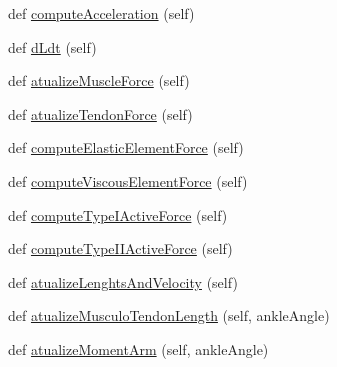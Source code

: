 \begin{DoxyCompactItemize}
\item 
def \hyperlink{class_muscle_hill_1_1_muscle_hill_aa29337f26cdc1d67d65658fab8e0cc41}{compute\+Acceleration} (self)
\item 
def \hyperlink{class_muscle_hill_1_1_muscle_hill_afbcb208bf18110d5fe1d498db8b6f95c}{d\+Ldt} (self)
\item 
def \hyperlink{class_muscle_hill_1_1_muscle_hill_ab39eb3b82b6299bbfbccb6d50f1da8b5}{atualize\+Muscle\+Force} (self)
\item 
def \hyperlink{class_muscle_hill_1_1_muscle_hill_ac40dbbdc08aa96669fe09f03bdffb2f2}{atualize\+Tendon\+Force} (self)
\item 
def \hyperlink{class_muscle_hill_1_1_muscle_hill_adf383b3c1665a6be27791644d67e3c44}{compute\+Elastic\+Element\+Force} (self)
\item 
def \hyperlink{class_muscle_hill_1_1_muscle_hill_ab4181e0db8cb650fd5b448fe58eefd33}{compute\+Viscous\+Element\+Force} (self)
\item 
def \hyperlink{class_muscle_hill_1_1_muscle_hill_a0af765b39293ebf39e992cefa2491141}{compute\+Type\+I\+Active\+Force} (self)
\item 
def \hyperlink{class_muscle_hill_1_1_muscle_hill_a3111f5bea9b94e9bc602a48efe95b146}{compute\+Type\+I\+I\+Active\+Force} (self)
\item 
def \hyperlink{class_muscle_hill_1_1_muscle_hill_a71ea33f1c30bdbe7cd795426bf097e78}{atualize\+Lenghts\+And\+Velocity} (self)
\item 
def \hyperlink{class_muscle_hill_1_1_muscle_hill_aef0260788a88702d48827323e04aa2a7}{atualize\+Musculo\+Tendon\+Length} (self, ankle\+Angle)
\item 
def \hyperlink{class_muscle_hill_1_1_muscle_hill_a1ddbb0455341626ea43181a47a3fb322}{atualize\+Moment\+Arm} (self, ankle\+Angle)
\end{DoxyCompactItemize}
